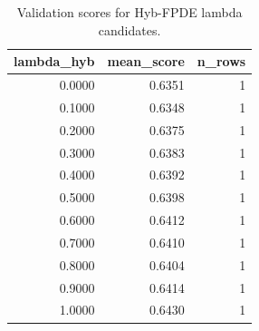 \begin{table}[t]
\caption{Validation scores for Hyb-FPDE lambda candidates.}
\label{tab:lambda_distribution_computed}
\centering
\begin{tabular}{rrr}
\toprule
lambda\_hyb & mean\_score & n\_rows \\
\midrule
0.0000 & 0.6351 & 1 \\
0.1000 & 0.6348 & 1 \\
0.2000 & 0.6375 & 1 \\
0.3000 & 0.6383 & 1 \\
0.4000 & 0.6392 & 1 \\
0.5000 & 0.6398 & 1 \\
0.6000 & 0.6412 & 1 \\
0.7000 & 0.6410 & 1 \\
0.8000 & 0.6404 & 1 \\
0.9000 & 0.6414 & 1 \\
1.0000 & 0.6430 & 1 \\
\bottomrule
\end{tabular}

\end{table}
